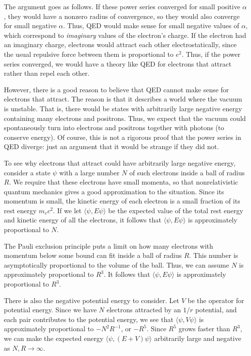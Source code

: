 \documentclass{article}
\begin{document}
The argument goes as follows. If these power series converged for small positive $\alpha$, they would have a nonzero radius of convergence, so they would also converge for small negative $\alpha$.  Thus, QED would make sense for small negative values of $\alpha$, which correspond to \emph{imaginary} values of the electron's charge.  If the electron had an imaginary charge, electrons would attract each other electrostatically, since the usual repulsive force between them is proportional to $e^2$.  Thus, if the power series converged, we would have a theory like QED for electrons that attract rather than repel each other.

However, there is a good reason to believe that QED cannot make sense for electrons that attract.  The reason is that it describes a world where the vacuum is unstable. That is, there would be states with arbitrarily large negative energy containing many electrons and positrons.  Thus, we expect that the vacuum could spontaneously turn into electrons and positrons together with photons (to conserve energy).   Of course, this is not a rigorous proof that the power series in QED diverge: just an argument that it would be strange if they did not.

To see why electrons that attract could have arbitrarily large negative energy, consider a state $\psi$ with a large number $N$ of such electrons inside a ball of radius $R$.   We require that these electrons have small momenta, so that nonrelativistic quantum mechanics gives a good approximation to the situation.   Since its momentum is small, the kinetic energy of each electron is a small fraction of its rest energy $m_e c^2$.   If we let $\langle \psi, E \psi\rangle$ be the expected value of the total rest energy and kinetic energy of all the electrons, it follows that $\langle \psi, E\psi \rangle$ is approximately proportional to $N$.

The Pauli exclusion principle puts a limit on how many electrons with momentum below some bound can fit inside a ball of radius $R$.    This number is asymptotically proportional to the volume of the ball.  Thus, we can assume $N$ is approximately proportional to $R^3$.    It follows that $\langle \psi, E \psi \rangle$ is approximately proportional to $R^3$.   

There is also the negative potential energy to consider.   Let $V$ be the operator for potential energy.  Since we have $N$ electrons attracted by an $1/r$ potential, and each pair contributes to the potential energy, we see that $\langle \psi , V \psi \rangle$ is approximately proportional to $-N^2 R^{-1}$, or $-R^5$.  Since $R^5$ grows faster than $R^3$, we can make the expected energy $\langle \psi, (E + V) \psi \rangle$ arbitrarily large and negative as $N,R \to \infty$.
\end{document}
